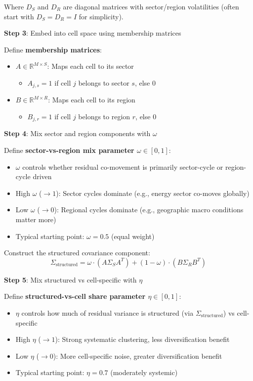 \documentclass[11pt,a4paper]{article}
\begin{document}
Where $D_S$ and $D_R$ are diagonal matrices with sector/region volatilities (often start with $D_S = D_R = I$ for simplicity).

\textbf{Step 3}: Embed into cell space using membership matrices

Define \textbf{membership matrices}:
\begin{itemize}
    \item $A \in \mathbb{R}^{M \times S}$: Maps each cell to its sector
    \begin{itemize}
        \item $A_{j,s} = 1$ if cell $j$ belongs to sector $s$, else 0
    \end{itemize}
    \item $B \in \mathbb{R}^{M \times R}$: Maps each cell to its region
    \begin{itemize}
        \item $B_{j,r} = 1$ if cell $j$ belongs to region $r$, else 0
    \end{itemize}
\end{itemize}

\textbf{Step 4}: Mix sector and region components with $\omega$

Define \textbf{sector-vs-region mix parameter $\omega \in [0,1]$}:
\begin{itemize}
    \item $\omega$ controls whether residual co-movement is primarily sector-cycle or region-cycle driven
    \item High $\omega$ ($\to 1$): Sector cycles dominate (e.g., energy sector co-moves globally)
    \item Low $\omega$ ($\to 0$): Regional cycles dominate (e.g., geographic macro conditions matter more)
    \item Typical starting point: $\omega = 0.5$ (equal weight)
\end{itemize}

Construct the structured covariance component:
\begin{equation}
\Sigma_{\text{structured}} = \omega \cdot (A \Sigma_S A^T) + (1-\omega) \cdot (B \Sigma_R B^T)
\end{equation}

\textbf{Step 5}: Mix structured vs cell-specific with $\eta$

Define \textbf{structured-vs-cell share parameter $\eta \in [0,1]$}:
\begin{itemize}
    \item $\eta$ controls how much of residual variance is structured (via $\Sigma_{\text{structured}}$) vs cell-specific
    \item High $\eta$ ($\to 1$): Strong systematic clustering, less diversification benefit
    \item Low $\eta$ ($\to 0$): More cell-specific noise, greater diversification benefit
    \item Typical starting point: $\eta = 0.7$ (moderately systemic)
\end{itemize}
\end{document}
